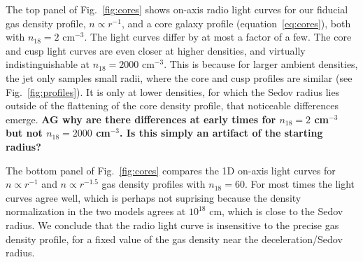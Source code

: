\documentclass[usenatbib,fleqn]{mnras}
\begin{document}
\label{sec:profileComp}
The top panel of Fig.~\ref{fig:cores} shows on-axis radio light curves
for our fiducial gas density profile, $n\propto r^{-1}$, and a core
galaxy profile (equation~\ref{eq:cores}), both with $n_{18}=2$
cm$^{-3}$.  The light curves differ by at most a factor of a few. The
core and cusp light curves are even closer at higher densities, and
virtually indistinguishable at $n_{18}=2000$ cm$^{-3}$. This is
because for larger ambient densities, the jet only samples small
radii, where the core and cusp profiles are similar (see
Fig.~\ref{fig:profiles}). It is only at lower densities, for which the
Sedov radius lies outside of the flattening of the core density
profile, that noticeable differences emerge. {\bf AG why are there
  differences at early times for $n_{18}=2$ cm$^{-3}$ but not
  $n_{18}=2000$ cm$^{-3}$. Is this simply an artifact of the starting
  radius?}

The bottom panel of Fig.~\ref{fig:cores} compares the 1D on-axis light
curves for $n\propto r^{-1}$ and $n\propto r^{-1.5}$ gas density
profiles with $n_{18}=60$. For most times the light curves agree well, which is perhaps not suprising because the density normalization in the two models agrees at $10^{18}$ cm, which is close to the Sedov radius.  We conclude that the radio light curve is insensitive to the precise gas density profile, for a fixed value of the gas density near the deceleration/Sedov radius.
\end{document}
